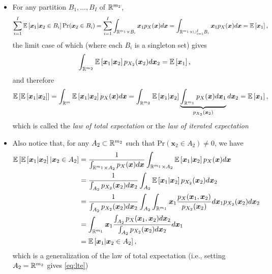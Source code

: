 \documentclass[12pt,a4paper]{article}
\begin{document}
\begin{itemize}
\begin{itemize}
  \item For any partition $B_{1},\ldots, B_{I}$ of $\mathbb{R}^{m_{2}}$,
    \begin{equation}\nonumber%
      \sum_{i=1}^{I}\mathbb{E}\left[\bm{x}_{1}| \bm{x}_{2}\in B_{i} \right]\text{Pr}(\bm{x}_{2}\in B_{i})
      =
      \sum_{i=1}^{I}\int_{\R^{m_{1}}\times B_{i}}\bm{x}_{1}p_{X}(\bm{x})d\bm{x}
      =
      \int_{\R^{m_{1}}\times\cup_{i=1}^{I}B_{i}}\bm{x}_{1}p_{X}(\bm{x})d\bm{x}
      = \mathbb{E}\left[\bm{x}_{1}\right],
    \end{equation}
    the limit case of which (where each $B_{i}$ is a singleton set) gives
    \begin{equation}\nonumber%
      \int_{\R^{m_{2}}}\mathbb{E}\left[ \bm{x}_{1}|\bm{x}_{2} \right]p_{X_{2}}(\bm{x}_{2})d\bm{x}_{2}
      = \mathbb{E}\left[\bm{x}_{1}\right],
    \end{equation}
    and therefore
    \begin{equation}\label{eq:lte}%
      \mathbb{E}\left[\mathbb{E}\left[ \bm{x}_{1}|\bm{x}_{2} \right]\right]
      = \int_{\R^{m}}\mathbb{E}\left[ \bm{x}_{1}|\bm{x}_{2} \right]p_{X}(\bm{x})d\bm{x}
      = \int_{\R^{m_{2}}}\mathbb{E}\left[ \bm{x}_{1}|\bm{x}_{2} \right]\underbrace{\int_{\R^{m_{1}}}p_{X}(\bm{x})d\bm{x}_{1}}_{p_{X_{2}}(\bm{x}_{2})}d\bm{x}_{2}
      = \mathbb{E}\left[\bm{x}_{1}\right],
    \end{equation}
    which is called the \emph{law of total expectation} or the \emph{law of iterated expectation}
  \item Also notice that, for any $A_{2}\subset \mathbb{R}^{m_{2}}$ such that $\text{Pr}(\bm{x}_{2}\in A_{2})\neq 0$, we have
    \begin{align}
      \mathbb{E}\left[\mathbb{E}\left[\bm{x}_{1}|\bm{x}_{2}\right] | \bm{x}_{2}\in A_{2} \right]
        & = \frac{1}{\int_{\R^{m_{1}}\times A_{2}}p_{X}(\bm{x})d\bm{x}}\int_{\R^{m_{1}}\times A_{2}}\mathbb{E}\left[\bm{x}_{1}|\bm{x}_{2}\right]p_{X}(\bm{x})d\bm{x} \nonumber \\
        & = \frac{1}{\int_{A_{2}}p_{X_{2}}(\bm{x}_{2})d\bm{x}_{2}}\int_{A_{2}}\mathbb{E}\left[\bm{x}_{1}|\bm{x}_{2}\right]p_{X_{2}}(\bm{x}_{2})d\bm{x}_{2} \nonumber \\
        & = \frac{1}{\int_{A_{2}}p_{X_{2}}(\bm{x}_{2})d\bm{x}_{2}}\int_{A_{2}}\int_{\R^{m_{1}}}\bm{x}_{1} \frac{p_{X}(\bm{x}_{1},\bm{x}_{2})}{p_{X_{2}}(\bm{x}_{2})}d\bm{x}_{1} p_{X_{2}}(\bm{x}_{2})d\bm{x}_{2}  \nonumber \\
        & = \int_{\R^{m_{1}}}\bm{x}_{1}\frac{\int_{A_{2}}p_{X}(\bm{x}_{1},\bm{x}_{2})d\bm{x}_{2}}{\int_{A_{2}}p_{X_{2}}(\bm{x}_{2})d\bm{x}_{2}}d\bm{x}_{1} \nonumber \\
        & = \mathbb{E}\left[\bm{x}_{1} | \bm{x}_{2}\in A_{2} \right],
    \nonumber%
    \end{align}
    which is a generalization of the law of total expectation
    (i.e., setting $A_{2}=\mathbb{R}^{m_{2}}$ gives \eqref{eq:lte})

  \end{itemize}
  
\end{itemize}
\end{document}
